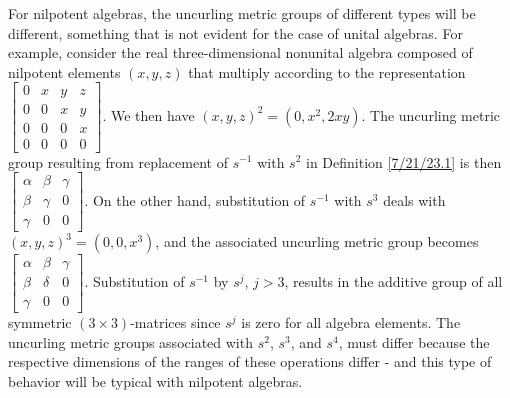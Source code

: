 \documentclass{amsart}
\numberwithin{equation}{section}
\theoremstyle{definition}
\numberwithin{theorem}{section}
\begin{document}
For nilpotent algebras, the uncurling metric groups of different types will be different, something that is not evident for the case of unital algebras. For example, consider the real three-dimensional nonunital algebra composed of nilpotent elements $(x,y,z)$ that multiply according to the representation
  $ \left[
\begin{array}{ccccc}
0 & x & y & z  \\
0 & 0 & x & y \\
0 & 0 & 0 & x \\
0 & 0 & 0 & 0
\end{array}
\right] $.  We then have $(x,y,z)^2 = (0,x^2, 2xy)$.  The uncurling metric group resulting from replacement of $s^{-1}$ with  $s^2$ in Definition \ref{7/21/23.1} is then $\left[
\begin{array}{ccccc}
\alpha & \beta & \gamma   \\
\beta & \gamma & 0 \\
\gamma & 0 & 0  
\end{array}
\right] $.  On the other hand, substitution of $s^{-1}$ with $s^3$  deals with $(x,y,z)^3 = (0,0, x^3)$, and the associated uncurling metric group becomes $\left[
\begin{array}{ccccc}
\alpha & \beta & \gamma   \\
\beta & \delta & 0 \\
\gamma & 0 & 0  
\end{array}
\right] $.  Substitution of $s^{-1}$ by $s^j$, $j>3$, results in the additive group of all symmetric $(3\times 3)$-matrices since $s^j$ is zero for all algebra elements.  The uncurling metric groups associated with $s^2$, $s^3$, and \enlargethispage{1cm} $s^4$, must differ because the respective dimensions of the ranges of these operations differ - and this type of behavior will be typical with nilpotent algebras.  
 

\bigskip

\appendix
\end{document}
